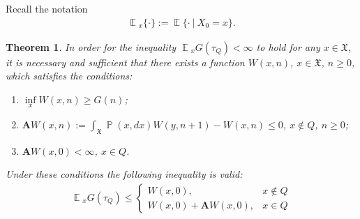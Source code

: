 \documentclass[10pt, reqno]{amsart}
\newtheorem*{theorem*}{Theorem}
\theoremstyle{definition}
\newcommand{\aasVar}{Q} %
\newcommand{\astVar}{\tau} %
\newcommand{\gtfVar}{G} %
\newcommand{\wtfVar}{W} %
\newcommand{\atoVar}{\mathbf{A}} %
\newcommand{\assVar}{\mathfrak{X}} %
\DeclareMathOperator*{\E}{\mathbb{E}}
\DeclareMathOperator*{\Pb}{\mathbb{P}}
\begin{document}
	Recall the notation
	\begin{gather}
	\E{}_{x}\{\cdot\} := \E\{\cdot \: | \: X_{0} = x\}.
	\end{gather}
	
	\begin{theorem*}
		In order for the inequality $\E{}_{x}\gtfVar(\astVar_{\aasVar}) < \infty$ to hold for any $x \in \assVar$, it is necessary and sufficient that there exists a function $\wtfVar(x, n)$, $x \in \assVar$, $n \geq 0$, which satisfies the conditions:
		\begin{enumerate}
			\item[(a)] $\underset{x}{\inf}\wtfVar(x, n) \geq \gtfVar(n)$;
			\item[(b)] $\atoVar\wtfVar(x, n) := \int_{\assVar}\Pb(x, dx)\wtfVar(y, n+1) - \wtfVar(x, n) \leq 0$, $x \notin \aasVar$, $n \geq 0$;
			\item[(c)] $\atoVar\wtfVar(x, 0) < \infty$, $x \in \aasVar$.
		\end{enumerate}
		Under these conditions the following inequality is valid:
		\begin{gather}
		\E{}_{x}\gtfVar(\astVar_{\aasVar}) \leq \begin{cases}
		\wtfVar(x, 0), & x \notin \aasVar \\
		\wtfVar(x, 0) + \atoVar\wtfVar(x, 0), & x \in \aasVar
		\end{cases}
		\label{main_G_W_inequality}
		\end{gather}
	\end{theorem*}
	
\end{document}
